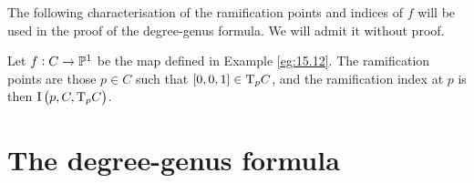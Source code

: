 The following characterisation of the ramification points and indices of $ f $ will be used in the proof of the degree-genus formula. We will admit it without proof.

\begin{proposition}
\label{prop:17.15}
Let $ f : C \to \mathbb{P}^1 $ be the map defined in Example \ref{eg:15.12}. The ramification points are those $ p \in C $ such that $ \sbr{0, 0, 1} \in \T_p C $, and the ramification index at $ p $ is then $ \I\br{p, C, \T_p C} $.
\end{proposition}

\pagebreak

\section{The degree-genus formula}

